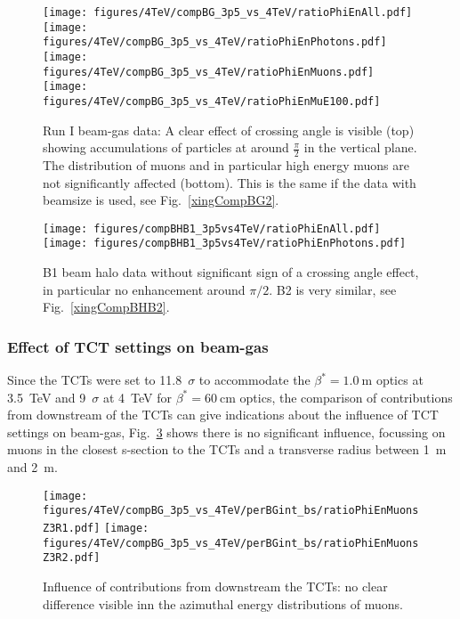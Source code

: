 \begin{figure}
\begin{center}
  \texttt{[image: figures/4TeV/compBG\_3p5\_vs\_4TeV/ratioPhiEnAll.pdf]}
  \texttt{[image: figures/4TeV/compBG\_3p5\_vs\_4TeV/ratioPhiEnPhotons.pdf]}
  \texttt{[image: figures/4TeV/compBG\_3p5\_vs\_4TeV/ratioPhiEnMuons.pdf]}
  \texttt{[image: figures/4TeV/compBG\_3p5\_vs\_4TeV/ratioPhiEnMuE100.pdf]}
\end{center}
\vspace{-0.6cm}
 \caption{Run I beam-gas data: A clear effect of crossing angle is visible (top) showing accumulations of particles at around $\frac{\pi}{2}$ in the vertical plane. The distribution of muons and in particular high energy muons are not significantly affected (bottom). This is the same if the data with beamsize is used, see Fig.~\ref{xingCompBG2}.
  \label{xingCompBG}}
\end{figure}


\begin{figure}
\centering
    \texttt{[image: figures/compBHB1\_3p5vs4TeV/ratioPhiEnAll.pdf]}
    \texttt{[image: figures/compBHB1\_3p5vs4TeV/ratioPhiEnPhotons.pdf]}
    \caption{B1 beam halo data without significant sign of a crossing angle effect, in particular no enhancement around $\pi/2$. B2 is very similar, see Fig.~\ref{xingCompBHB2}.
      \label{xingCompBHB1}
      }
\end{figure}

\subsubsection{Effect of TCT settings on beam-gas}

Since the TCTs were set to 11.8~$\sigma$ to accommodate the $\beta^* = 1.0~$m optics at 3.5~TeV and 9~$\sigma$ at 4~TeV for $\beta^* = 60~$cm optics, the comparison of contributions from downstream of the TCTs can give indications about the influence of TCT settings on beam-gas, Fig.~\ref{compBGrun1} shows there is no significant influence, focussing on muons in the closest s-section to the TCTs and a transverse radius between 1~m and 2~m.

\begin{figure}
  \centering
  \texttt{[image: figures/4TeV/compBG\_3p5\_vs\_4TeV/perBGint\_bs/ratioPhiEnMuonsZ3R1.pdf]}
  \texttt{[image: figures/4TeV/compBG\_3p5\_vs\_4TeV/perBGint\_bs/ratioPhiEnMuonsZ3R2.pdf]}
  \caption{Influence of contributions from downstream the TCTs: no clear difference visible inn the azimuthal energy distributions of muons.
  \label{compBGrun1}}
\end{figure}

